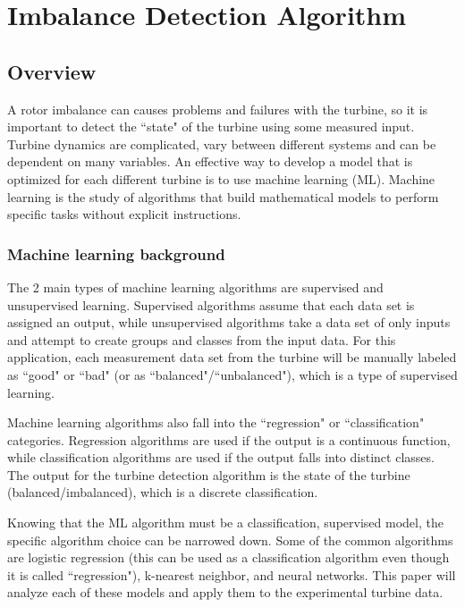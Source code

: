 \chapter{Imbalance Detection Algorithm} %


\label{ch_detection_algorithm}

\section{Overview}
A rotor imbalance can causes problems and failures with the turbine, so it is important to detect the ``state" of the turbine using some measured input.  Turbine dynamics are complicated, vary between different systems and can be dependent on many variables.  An effective way to develop a model that is optimized for each different turbine is to use machine learning (ML).  Machine learning is the study of algorithms that build mathematical models to perform specific tasks without explicit instructions.

\subsection{Machine learning background}
The 2 main types of machine learning algorithms are supervised and unsupervised learning.  Supervised algorithms assume that each data set is assigned an output, while unsupervised algorithms take a data set of only inputs and attempt to create groups and classes from the input data.  For this application, each measurement data set from the turbine will be manually labeled as ``good" or ``bad" (or as ``balanced"/``unbalanced"), which is a type of supervised learning.

Machine learning algorithms also fall into the ``regression" or ``classification" categories.  Regression algorithms are used if the output is a continuous function, while classification algorithms are used if the output falls into distinct classes.  The output for the turbine detection algorithm is the state of the turbine (balanced/imbalanced), which is a discrete classification.

Knowing that the ML algorithm must be a classification, supervised model, the specific algorithm choice can be narrowed down.  Some of the common algorithms are logistic regression (this can be used as a classification algorithm even though it is called ``regression"), k-nearest neighbor, and neural networks.  This paper will analyze each of these models and apply them to the experimental turbine data.


